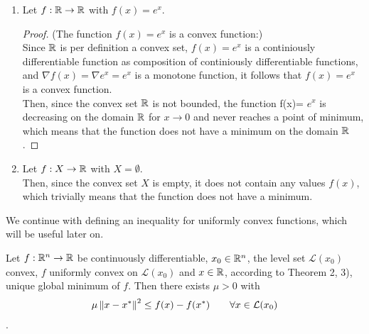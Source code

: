 \begin{beispiel} \label{example:5}
	\begin{enumerate}[label=(\arabic*)]
		\item Let $f:\mathbb{R}\rightarrow\mathbb{R}$ with $f(x)=e^x$.
		\begin{proof} (The function \(f(x)=e^x\) is a convex function:) \\
			Since $\mathbb{R}$ is per definition a convex set, $f(x)=e^x$ is a continiously differentiable function as composition of continiously differentiable functions, and $\nabla{f(x)} = \nabla e^x = e^x$ is a monotone function, it follows that $f(x)=e^x$ is a convex function. \\
			Then, since the convex set $\mathbb{R}$ is not bounded, the function f(x)= $e^x$ is decreasing on the domain $\mathbb{R}$ for $x \rightarrow 0$ and never reaches a point of minimum, which means that the function does not have a minimum on the domain $\mathbb{R}$.
		\end{proof}
		\item Let $f:X\rightarrow\mathbb{R}$  with $X=\emptyset$. \\
		Then, since the convex set $X$ is empty, it does not contain any values $f(x)$, which trivially means that the function does not have a minimum.
	\end{enumerate}
	
	\begin{center}
	\end{center}
	
\end{beispiel}

We continue with defining an inequality for uniformly convex functions, which will be useful later on.

\begin{lemma}
	Let $f:\mathbb{R}^n\rightarrow\mathbb{R}$ be continuously differentiable, $x_0 \in\mathbb{R}^n$, the level set $\mathcal{L}(x_0)$ convex, $f$ uniformly convex on $\mathcal{L}(x_0)$ and $x \in\mathbb{R}$, according to Theorem 2, 3), unique global minimum of $f$. Then there exists $\mu>0$ with
	\begin{align*}
	\mu \left\lVert x-x^* \right\Vert^2 \leq f(x)-f(x^*) \qquad \forall \bigskip x \in \mathcal{L}(x_0)
	\end{align*}. 
\end{lemma}

